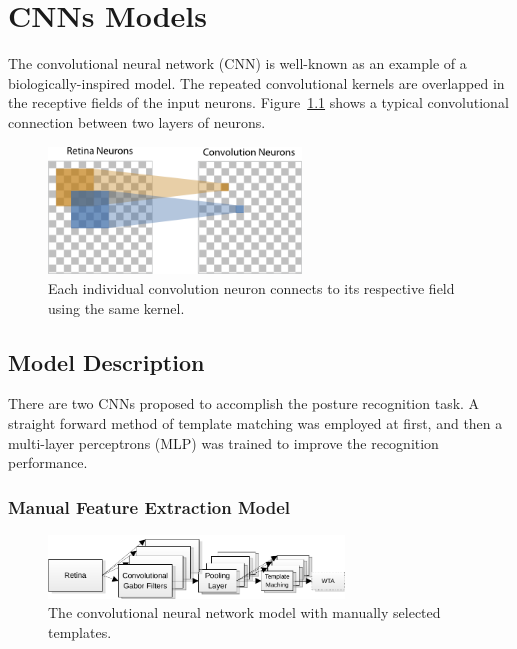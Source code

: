 \chapter{CNNs Models}
\label{cha:cnn}
The convolutional neural network (CNN) is well-known as an example of a biologically-inspired model. 
The repeated convolutional kernels are overlapped in the receptive fields of the input neurons. 
Figure~\ref{fig:conv} shows a typical convolutional connection between two layers of neurons. 


\begin{figure}
\centering
	\includegraphics[width=0.6\textwidth]{pics/convolution.png}
	\caption{Each individual convolution neuron connects to its respective field using the same kernel.}
	\label{fig:conv}
\end{figure}

\section{Model Description}
\label{sec:mds}
There are two CNNs proposed to accomplish the posture recognition task.
A straight forward method of template matching was employed at first, and then a multi-layer perceptrons (MLP) was trained to improve the recognition performance.
\subsection{Manual Feature Extraction Model}

\begin{figure}
\centering
	\includegraphics[width=0.7\textwidth]{pics/model1.pdf}
	\caption{The convolutional neural network model with manually selected templates.}
	\label{fig:model1}
\end{figure}


